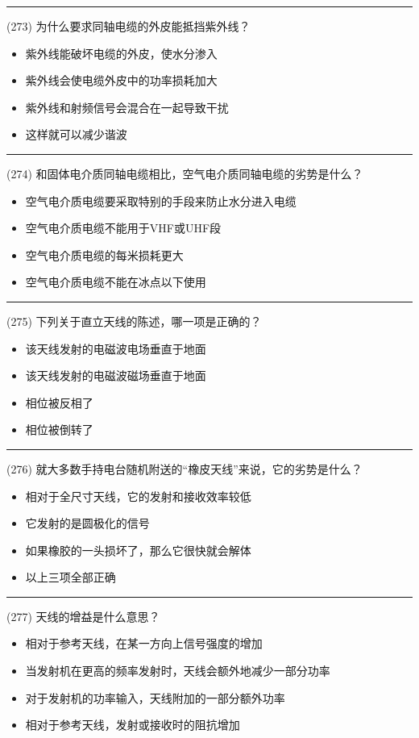 \documentclass[twocolumn]{ctexart}  %
\begin{document}
\noindent\rule{0.5\textwidth}{1pt}
\heiti (273) 为什么要求同轴电缆的外皮能抵挡紫外线？ \songti {\color{gray} [LK1190] }
\begin{itemize}
	\item  紫外线能破坏电缆的外皮，使水分渗入
	\item  紫外线会使电缆外皮中的功率损耗加大
	\item  紫外线和射频信号会混合在一起导致干扰
	\item  这样就可以减少谐波
\end{itemize}


\noindent\rule{0.5\textwidth}{1pt}
\heiti (274) 和固体电介质同轴电缆相比，空气电介质同轴电缆的劣势是什么？ \songti {\color{gray} [LK1191] }
\begin{itemize}
	\item  空气电介质电缆要采取特别的手段来防止水分进入电缆
	\item  空气电介质电缆不能用于VHF或UHF段
	\item  空气电介质电缆的每米损耗更大
	\item  空气电介质电缆不能在冰点以下使用
\end{itemize}


\noindent\rule{0.5\textwidth}{1pt}
\heiti (275) 下列关于直立天线的陈述，哪一项是正确的？ \songti {\color{gray} [LK1211] }
\begin{itemize}
	\item  该天线发射的电磁波电场垂直于地面
	\item  该天线发射的电磁波磁场垂直于地面
	\item  相位被反相了
	\item  相位被倒转了
\end{itemize}


\noindent\rule{0.5\textwidth}{1pt}
\heiti (276) 就大多数手持电台随机附送的“橡皮天线”来说，它的劣势是什么？ \songti {\color{gray} [LK1213] }
\begin{itemize}
	\item  相对于全尺寸天线，它的发射和接收效率较低
	\item  它发射的是圆极化的信号
	\item  如果橡胶的一头损坏了，那么它很快就会解体
	\item  以上三项全部正确
\end{itemize}


\noindent\rule{0.5\textwidth}{1pt}
\heiti (277) 天线的增益是什么意思？ \songti {\color{gray} [LK1216] }
\begin{itemize}
	\item  相对于参考天线，在某一方向上信号强度的增加
	\item  当发射机在更高的频率发射时，天线会额外地减少一部分功率
	\item  对于发射机的功率输入，天线附加的一部分额外功率
	\item  相对于参考天线，发射或接收时的阻抗增加
\end{itemize}
\end{document}
